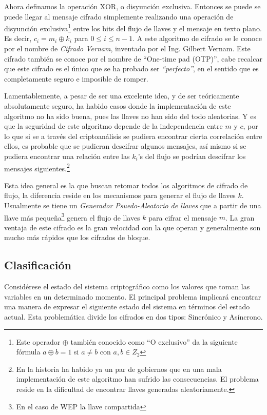 Ahora definamos la operación XOR, o disyunción exclusiva.  Entonces se puede se puede llegar al mensaje cifrado simplemente realizando una operación de disyunción exclusiva\footnote{Este operador $ \oplus $ también conocido como ``O exclusivo'' da la siguiente fórmula $a \oplus b = 1$ si $a \neq b$ con $ a , b \in Z_2 $} entre los bits del flujo de llaves y el mensaje en texto plano. Es decir, $c_i = m_i \oplus k_i$ para $0 \leq i\leq n-1$. A este algoritmo de cifrado se le conoce por el nombre de \emph{Cifrado Vernam}, inventado por el Ing. Gilbert Vernam. Este cifrado también se conoce por el nombre de ``One-time pad (OTP)'', cabe recalcar que este cifrado es el único que se ha probado ser  \emph{``perfecto''}, en el sentido que es completamente seguro e imposible de romper.

Lamentablemente, a pesar de ser una excelente idea, y de ser teóricamente absolutamente seguro, ha habido casos donde la implementación de este algoritmo no ha sido buena, pues las llaves no han sido del todo aleatorias. Y es que la seguridad de este algoritmo depende de la independencia entre $m$ y $c$, por lo que si se a través del criptoanálisis se pudiera encontrar cierta correlación entre ellos, es probable que se pudieran descifrar algunos mensajes, así mismo si se pudiera encontrar una relación entre las $k_i$'s del flujo se podrían descifrar los mensajes siguientes.\footnote{En la historia ha habido ya un par de gobiernos que en una mala implementación de este algoritmo han sufrido las consecuencias. El problema reside en la dificultad de encontrar llaves generadas aleatoriamente.}

Esta idea general es la que buscan retomar todos los algoritmos de cifrado de flujo, la diferencia reside en los mecanismos para generar el flujo de llaves $k$. Usualmente se tiene un \emph{Generador Psuedo-Aleatorio de llaves} que a partir de una llave más pequeña\footnote{En el caso de WEP la llave compartida} genera el flujo de llaves $k$ para cifrar el mensaje $m$. La gran ventaja de este cifrado es la gran velocidad con la que operan y generalmente son mucho más rápidos que los cifrados de bloque.

\subsection{Clasificación}
Considérese el estado del sistema criptográfico como los valores que toman las variables en un determinado momento. El principal problema implicará encontrar una manera de expresar el siguiente estado del sistema  en términos del estado actual. Esta problemática divide los cifrados en dos tipos: Sincrónico y Asíncrono.

